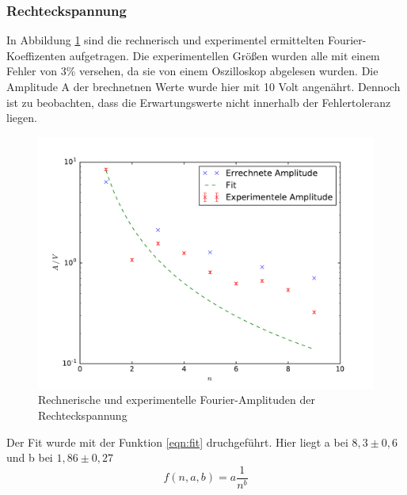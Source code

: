\subsubsection{Rechteckspannung}
In Abbildung \ref{fig:pr} sind die rechnerisch und experimentel ermittelten Fourier-Koeffizenten aufgetragen. Die experimentellen Größen wurden alle mit einem Fehler
von 3\% versehen, da sie von einem Oszilloskop abgelesen wurden. Die Amplitude A der brechnetnen Werte wurde hier mit 10 Volt angenährt.
Dennoch ist zu beobachten, dass die Erwartungswerte nicht innerhalb der Fehlertoleranz liegen.
\begin{figure}
  \centering
  \includegraphics[width= \textwidth]{Plots/Rechteckplot.pdf}
  \caption{Rechnerische und experimentelle Fourier-Amplituden der Rechteckspannung}
  \label{fig:pr}
\end{figure}
\FloatBarrier
Der Fit wurde mit der Funktion \eqref{eqn:fit} druchgeführt. Hier liegt a bei $ 8, 3 \pm 0,6$
und b bei $1,86 \pm 0,27 $
\begin{equation}
  f(n , a , b) = a\frac{1}{n^b}
\label{eqn:fit}
\end{equation}

